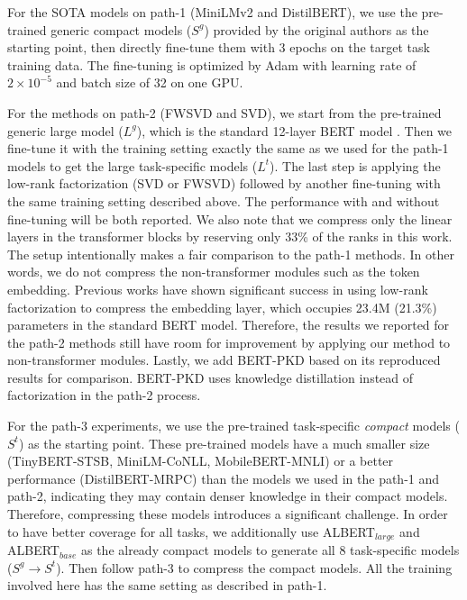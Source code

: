 \documentclass{article} %
\newcommand{\yh}[1]{}
\newcommand{\yh}[1]{{\color{green}{(Yen: #1)}}}
\begin{document}
For the SOTA models on path-1 (MiniLMv2 and DistilBERT), we use the pre-trained generic compact models ($S^g$) provided by the original authors as the starting point, then directly fine-tune them with 3 epochs on the target task training data. The fine-tuning is optimized by Adam with learning rate of $2 \times 10^{-5}$ and batch size of 32 on one GPU.

For the methods on path-2 (FWSVD and SVD), we start from the pre-trained generic large model ($L^g$), which is the standard 12-layer BERT model \citep{devlin2018bert}. Then we fine-tune it with the training setting exactly the same as we used for the path-1 models to get the large task-specific models ($L^t$). The last step is applying the low-rank factorization (SVD or FWSVD) followed by another fine-tuning with the same training setting described above. The performance with and without fine-tuning will be both reported.
We also note that we compress only the linear layers in the transformer blocks by reserving only 33\% of the ranks in this work. The setup intentionally makes a fair comparison to the path-1 methods. In other words, we do not compress the non-transformer modules such as the token embedding. Previous works \citep{chen2018groupreduce} have shown significant success in using low-rank factorization to compress the embedding layer, which occupies 23.4M (21.3\%) parameters in the standard BERT model. Therefore, the results we reported for the path-2 methods still have room for improvement by applying our method to non-transformer modules. Lastly, we add BERT-PKD \citep{sun2019patient} based on its reproduced results \citep{chen2018groupreduce} for comparison. BERT-PKD uses knowledge distillation instead of factorization in the path-2 process.


For the path-3 experiments, we use the pre-trained task-specific \textit{compact} models ($S^t$) as the starting point. These pre-trained models have a much smaller size (TinyBERT-STSB, MiniLM-CoNLL, MobileBERT-MNLI) or a better performance (DistilBERT-MRPC) than the models we used in the path-1 and path-2, indicating they may contain denser knowledge in their compact models. Therefore, compressing these models introduces a significant challenge. In order to have better coverage for all tasks, we additionally use ALBERT$_{large}$ and ALBERT$_{base}$ \citep{lan2019albert} as the already compact models to generate all 8 task-specific models ($S^g \rightarrow S^t$). Then follow path-3 to compress the compact models. All the training involved here has the same setting as described in path-1.
\end{document}
